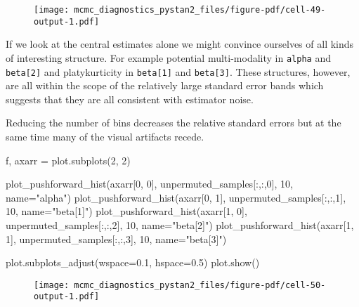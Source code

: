 \documentclass[
  letterpaper,
  DIV=11,
  numbers=noendperiod]{scrartcl}
\newenvironment{Shaded}{\begin{snugshade}}{\end{snugshade}}
\newcommand{\DecValTok}[1]{\textcolor[rgb]{0.68,0.00,0.00}{#1}}
\newcommand{\FloatTok}[1]{\textcolor[rgb]{0.68,0.00,0.00}{#1}}
\newcommand{\NormalTok}[1]{\textcolor[rgb]{0.00,0.23,0.31}{#1}}
\newcommand{\OperatorTok}[1]{\textcolor[rgb]{0.37,0.37,0.37}{#1}}
\newcommand{\StringTok}[1]{\textcolor[rgb]{0.13,0.47,0.30}{#1}}
\begin{document}
\begin{figure}[H]

{\centering \texttt{[image: mcmc\_diagnostics\_pystan2\_files/figure-pdf/cell-49-output-1.pdf]}

}

\end{figure}

If we look at the central estimates alone we might convince ourselves of
all kinds of interesting structure. For example potential multi-modality
in \texttt{alpha} and \texttt{beta{[}2{]}} and platykurticity in
\texttt{beta{[}1{]}} and \texttt{beta{[}3{]}}. These structures,
however, are all within the scope of the relatively large standard error
bands which suggests that they are all consistent with estimator noise.

Reducing the number of bins decreases the relative standard errors but
at the same time many of the visual artifacts recede.

\begin{Shaded}
\begin{Highlighting}[]
\NormalTok{f, axarr }\OperatorTok{=}\NormalTok{ plot.subplots(}\DecValTok{2}\NormalTok{, }\DecValTok{2}\NormalTok{)}

\NormalTok{plot\_pushforward\_hist(axarr[}\DecValTok{0}\NormalTok{, }\DecValTok{0}\NormalTok{], unpermuted\_samples[:,:,}\DecValTok{0}\NormalTok{], }\DecValTok{10}\NormalTok{, name}\OperatorTok{=}\StringTok{"alpha"}\NormalTok{)}
\NormalTok{plot\_pushforward\_hist(axarr[}\DecValTok{0}\NormalTok{, }\DecValTok{1}\NormalTok{], unpermuted\_samples[:,:,}\DecValTok{1}\NormalTok{], }\DecValTok{10}\NormalTok{, name}\OperatorTok{=}\StringTok{"beta[1]"}\NormalTok{)}
\NormalTok{plot\_pushforward\_hist(axarr[}\DecValTok{1}\NormalTok{, }\DecValTok{0}\NormalTok{], unpermuted\_samples[:,:,}\DecValTok{2}\NormalTok{], }\DecValTok{10}\NormalTok{, name}\OperatorTok{=}\StringTok{"beta[2]"}\NormalTok{)}
\NormalTok{plot\_pushforward\_hist(axarr[}\DecValTok{1}\NormalTok{, }\DecValTok{1}\NormalTok{], unpermuted\_samples[:,:,}\DecValTok{3}\NormalTok{], }\DecValTok{10}\NormalTok{, name}\OperatorTok{=}\StringTok{"beta[3]"}\NormalTok{)}

\NormalTok{plot.subplots\_adjust(wspace}\OperatorTok{=}\FloatTok{0.1}\NormalTok{, hspace}\OperatorTok{=}\FloatTok{0.5}\NormalTok{)}
\NormalTok{plot.show()}
\end{Highlighting}
\end{Shaded}

\begin{figure}[H]

{\centering \texttt{[image: mcmc\_diagnostics\_pystan2\_files/figure-pdf/cell-50-output-1.pdf]}

}

\end{figure}
\end{document}
